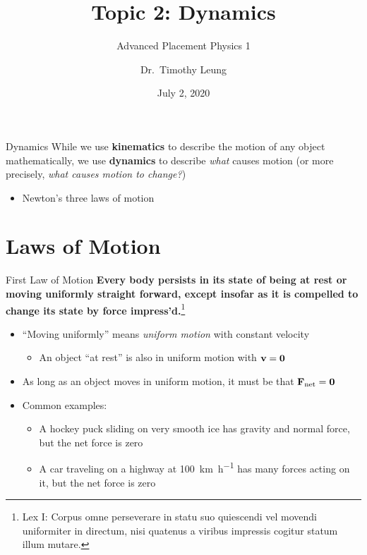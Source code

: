 \documentclass[12pt,compress,aspectratio=169]{beamer}
\title{Topic 2: Dynamics}
\subtitle{Advanced Placement Physics 1}
\author[TML]{Dr.\ Timothy Leung}
\institute{Olympiads School}
\date{July 2, 2020}
\newcommand{\mb}[1]{\ensuremath\mathbf{#1}}
\begin{document}
\begin{frame}
  \maketitle
\end{frame}

\begin{frame}{Dynamics}
  While we use \textbf{kinematics} to describe the motion of any object
  mathematically, we use \textbf{dynamics} to describe \emph{what} causes
  motion (or more precisely, \emph{what causes motion to change?})
  \begin{itemize}
  \item Newton's three laws of motion
  \end{itemize}
\end{frame}



\section{Laws of Motion}

\begin{frame}{First Law of Motion}
  \textbf{Every body persists in its state of being at rest or moving uniformly
    straight forward, except insofar as it is compelled to change its state by
    force impress'd.}\footnote{Lex I: Corpus omne perseverare in statu suo
    quiescendi vel movendi uniformiter in directum, nisi quatenus a viribus
    impressis cogitur statum illum mutare.}
  
  \begin{itemize}
  \item ``Moving uniformly'' means \emph{uniform motion} with constant velocity
    \begin{itemize}
    \item An object ``at rest'' is also in uniform motion with $\mb{v}=\mb{0}$
    \end{itemize}
  \item As long as an object moves in uniform motion, it must be that
    $\mb{F}_\mathrm{net}=\mb{0}$
  \item Common examples:
    \begin{itemize}
    \item A hockey puck sliding on very smooth ice has gravity and normal
      force, but the net force is zero
    \item A car traveling on a highway at \SI{100}{\kilo\metre\per\hour}
      has many forces acting on it, but the net force is zero 
    \end{itemize}
  \end{itemize}
  \vspace{.2in}
\end{frame}
\end{document}
